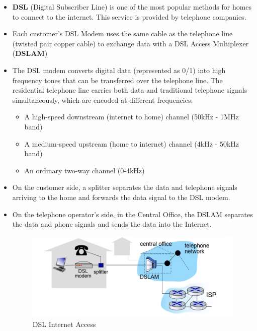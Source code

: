 \documentclass{article}
\theoremstyle{plain}
\theoremstyle{definition}
\begin{document}
\begin{itemize}
    \item \textbf{DSL} (Digital Subscriber Line) is one of the most popular methods for homes to connect to the internet. This service is provided by telephone companies. 
    
    \item Each customer's DSL Modem uses the same cable as the telephone line (twisted pair copper cable) to exchange data with a DSL Access Multiplexer (\textbf{DSLAM}) 
    
    \item The DSL modem converts digital data (represented as 0/1) into high frequency tones that can be transferred over the telephone line. The residential telephone line carries both data and traditional telephone signals
    simultaneously, which are encoded at different frequencies:
    
    \begin{itemize}
        \item A high-speed downstream (internet to home) channel (50kHz - 1MHz band)
        
        \item A medium-speed upstream (home to internet) channel (4kHz - 50kHz band)
        
        \item An ordinary two-way channel (0-4kHz)
    \end{itemize}
    
    \item On the customer side, a splitter separates the data and telephone signals arriving to the home and forwards the data signal to the DSL modem.
    
    \item On the telephone operator's side, in the Central Office, the DSLAM separates the data and phone signals and sends the data into the Internet.

\begin{figure}[h]
    \centering
    \includegraphics[scale=0.8]{cn2.png}
    \caption{DSL Internet Access}
    \label{fig:my_label_3}
\end{figure}
\end{itemize}
\end{document}
